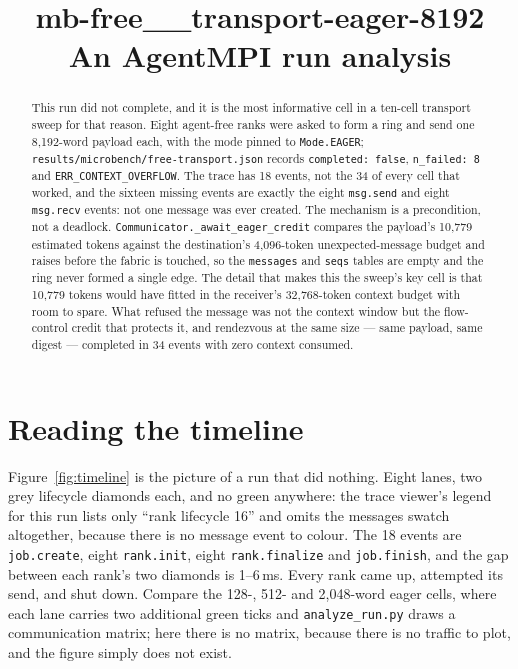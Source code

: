 \documentclass[11pt]{article}
\title{\textbf{mb-free\_\_transport-eager-8192}\\[2pt]\large An AgentMPI run analysis}
\author{}
\date{}
\begin{document}
\maketitle

\begin{abstract}
This run did not complete, and it is the most informative cell in a ten-cell
transport sweep for that reason. Eight agent-free ranks were asked to form a ring
and send one 8{,}192-word payload each, with the mode pinned to \texttt{Mode.EAGER};
\texttt{results/microbench/free-transport.json} records \texttt{completed: false},
\texttt{n\_failed: 8} and \texttt{ERR\_CONTEXT\_OVERFLOW}. The trace has 18 events,
not the 34 of every cell that worked, and the sixteen missing events are exactly the
eight \texttt{msg.send} and eight \texttt{msg.recv} events: not one message was ever
created. The mechanism is a precondition, not a deadlock.
\texttt{Communicator.\_await\_eager\_credit} compares the payload's 10{,}779
estimated tokens against the destination's 4{,}096-token unexpected-message budget
and raises before the fabric is touched, so the \texttt{messages} and \texttt{seqs}
tables are empty and the ring never formed a single edge. The detail that makes this
the sweep's key cell is that 10{,}779 tokens would have fitted in the receiver's
32{,}768-token context budget with room to spare. What refused the message was not
the context window but the flow-control credit that protects it, and rendezvous at
the same size --- same payload, same digest --- completed in 34 events with zero
context consumed.
\end{abstract}



\section{Reading the timeline}

Figure~\ref{fig:timeline} is the picture of a run that did nothing. Eight lanes,
two grey lifecycle diamonds each, and no green anywhere: the trace viewer's legend
for this run lists only ``rank lifecycle 16'' and omits the messages swatch
altogether, because there is no message event to colour. The 18 events are
\texttt{job.create}, eight \texttt{rank.init}, eight \texttt{rank.finalize} and
\texttt{job.finish}, and the gap between each rank's two diamonds is 1--6\,ms. Every
rank came up, attempted its send, and shut down. Compare the 128-, 512- and
2{,}048-word eager cells, where each lane carries two additional green ticks and
\texttt{analyze\_run.py} draws a communication matrix; here there is no matrix,
because there is no traffic to plot, and the figure simply does not exist.
\end{document}
